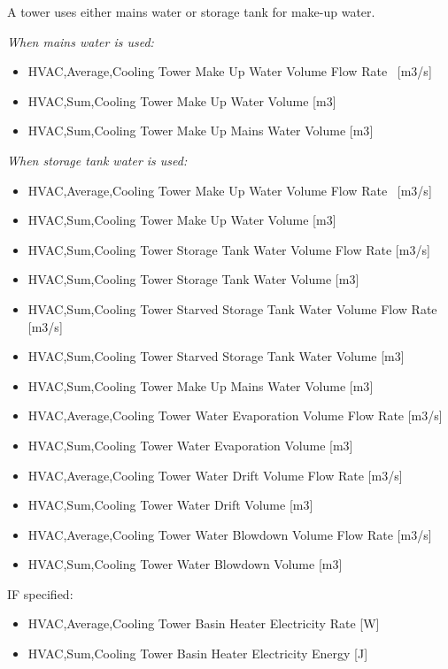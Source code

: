 A tower uses either mains water or storage tank for make-up water.

\emph{When mains water is used:}

\begin{itemize}
\item
  HVAC,Average,Cooling Tower Make Up Water Volume Flow Rate~ {[}m3/s{]}
\item
  HVAC,Sum,Cooling Tower Make Up Water Volume {[}m3{]}
\item
  HVAC,Sum,Cooling Tower Make Up Mains Water Volume {[}m3{]}
\end{itemize}

\emph{When storage tank water is used:}

\begin{itemize}
\item
  HVAC,Average,Cooling Tower Make Up Water Volume Flow Rate~ {[}m3/s{]}
\item
  HVAC,Sum,Cooling Tower Make Up Water Volume {[}m3{]}
\item
  HVAC,Sum,Cooling Tower Storage Tank Water Volume Flow Rate {[}m3/s{]}
\item
  HVAC,Sum,Cooling Tower Storage Tank Water Volume {[}m3{]}
\item
  HVAC,Sum,Cooling Tower Starved Storage Tank Water Volume Flow Rate {[}m3/s{]}
\item
  HVAC,Sum,Cooling Tower Starved Storage Tank Water Volume {[}m3{]}
\item
  HVAC,Sum,Cooling Tower Make Up Mains Water Volume {[}m3{]}
\item
  HVAC,Average,Cooling Tower Water Evaporation Volume Flow Rate {[}m3/s{]}
\item
  HVAC,Sum,Cooling Tower Water Evaporation Volume {[}m3{]}
\item
  HVAC,Average,Cooling Tower Water Drift Volume Flow Rate {[}m3/s{]}
\item
  HVAC,Sum,Cooling Tower Water Drift Volume {[}m3{]}
\item
  HVAC,Average,Cooling Tower Water Blowdown Volume Flow Rate {[}m3/s{]}
\item
  HVAC,Sum,Cooling Tower Water Blowdown Volume {[}m3{]}
\end{itemize}

IF specified:

\begin{itemize}
\item
  HVAC,Average,Cooling Tower Basin Heater Electricity Rate {[}W{]}
\item
  HVAC,Sum,Cooling Tower Basin Heater Electricity Energy {[}J{]}
\end{itemize}

